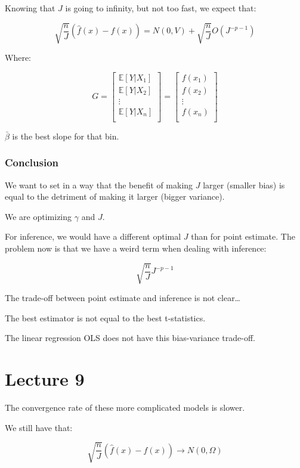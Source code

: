 \documentclass{article}
\begin{document}
Knowing that $J$ is going to infinity, but not too fast, we expect that:

$$
\sqrt{\frac{n}{J}} (\hat{f}(x) - f(x)) = N(0, V) + \sqrt{\frac{n}{J}} O(J^{-p-1})
$$

Where:

$$
G = \left[
\begin{matrix*}
    \mathbb{E}[Y | X_1] \\
    \mathbb{E}[Y | X_2] \\
    \vdots \\
    \mathbb{E}[Y | X_n] \\
\end{matrix*}
\right]
=
\left[
    \begin{matrix*}
        f(x_1) \\
        f(x_2) \\
        \vdots \\
        f(x_n) \\
    \end{matrix*}
\right]
$$

$\bar{\beta}$ is the best slope for that bin.

\subsubsection{Conclusion}
We want to set in a way that the benefit of making $J$ larger (smaller bias) is equal to the detriment of making it larger (bigger variance).

We are optimizing $\gamma$ and $J$.

For inference, we would have a different optimal $J$ than for point estimate. The problem now is that we have a weird term when dealing with inference:

$$
\sqrt{\frac{n}{J}} J^{-p-1}
$$

The trade-off between point estimate and inference is not clear\dots

The best estimator is not equal to the best t-statistics.

The linear regression OLS does not have this bias-variance trade-off.

\section{Lecture 9}

The convergence rate of these more complicated models is slower.

We still have that:

$$
\sqrt{\frac{n}{J}} \left( \hat{f}(x) - f(x) \right) \to N(0, \Omega)
$$
\end{document}
